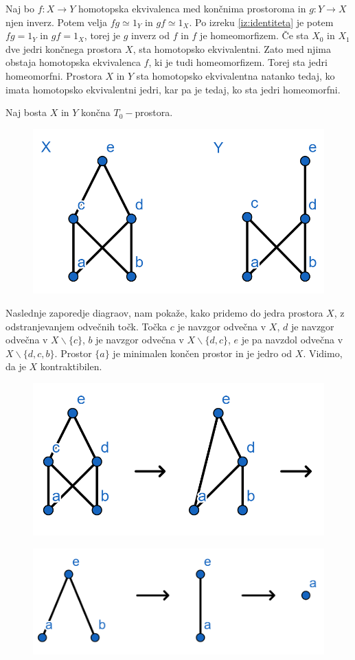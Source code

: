 \documentclass[mat1]{fmfdelo}
\begin{document}
\begin{dokaz}
    Naj bo $f\colon X\rightarrow Y$ homotopska ekvivalenca med 
    končnima prostoroma in $g\colon Y\rightarrow X$ njen inverz. 
    Potem velja $fg\simeq 1_Y$ in $gf \simeq 1_X$. Po izreku 
    \ref{iz:identiteta} je potem $fg = 1_Y$ in $gf = 1_X$,
    torej je $g$ inverz od $f$ in $f$ je homeomorfizem. Če 
    sta $X_0$ in $X_1$ dve jedri končnega prostora $X$,
    sta homotopsko ekvivalentni. Zato med njima obstaja homotopska ekvivalenca $f$, 
    ki je tudi homeomorfizem. Torej sta jedri homeomorfni. 
    Prostora $X$ in $Y$ sta homotopsko ekvivalentna
    natanko tedaj, ko imata homotopsko ekvivalentni jedri, 
    kar pa je tedaj, ko sta jedri homeomorfni.
\end{dokaz}
\begin{primer}
    Naj bosta $X$ in $Y$ končna $T_0-$prostora.
    \begin{figure}[h!]
        \centering
        \includegraphics[width=0.5\linewidth]{hasse0.png}
    \end{figure}
    Naslednje zaporedje diagraov, nam pokaže, kako pridemo do jedra prostora $X$, z odstranjevanjem odvečnih točk. Točka $c$ je navzgor odvečna v $X$, $d$ je navzgor odvečna v $X\backslash\{c\}$, $b$ je navzgor odvečna v $X\backslash\{d,c\}$, $e$ je pa navzdol odvečna v $X\backslash\{d,c,b\}$. Prostor $\{a\}$ je minimalen končen prostor in je jedro od $X$. Vidimo, da je $X$ kontraktibilen.
    
    \begin{figure}[h!]
        \centering
        \includegraphics[width=0.5\linewidth]{hasse1.png}
    \end{figure}
     
    \begin{figure}[h!]
        \centering
        \includegraphics[width=0.5\linewidth]{hasse2.png}
    \end{figure}


\end{primer}
\end{document}
